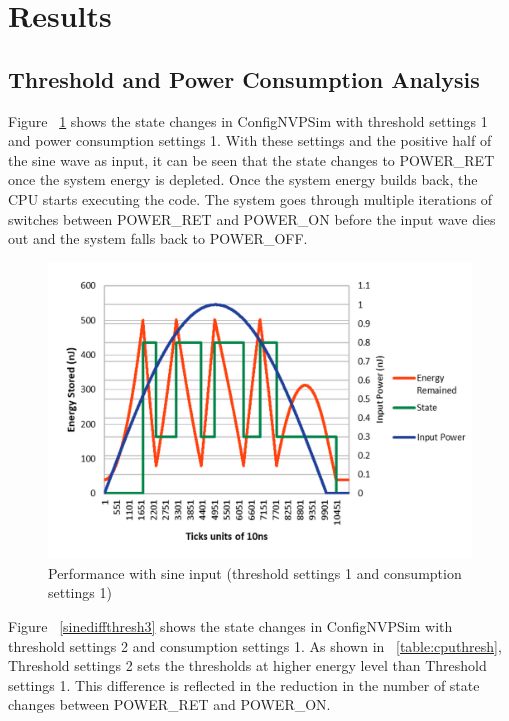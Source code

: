 \documentclass[conference]{IEEEtran}
\begin{document}
\section{\textbf{Results}}
\subsection{Threshold and Power Consumption Analysis}
Figure ~\ref{sine3} shows the state changes in ConfigNVPSim with threshold settings 1 and power consumption settings 1. With these settings and the positive half of the sine wave as input, it can be seen that the state changes to POWER\_RET once the system energy is depleted. Once the system energy builds back, the CPU starts executing the code. The system goes through multiple iterations of switches between POWER\_RET and POWER\_ON before the input wave dies out and the system falls back to POWER\_OFF. 

\begin{figure}[htbp]
\centerline{\includegraphics[scale=0.3]{sine3.png}}
\caption{Performance with sine input (threshold settings 1 and consumption settings 1)}
\label{sine3}
\end{figure}

Figure ~\ref{sinediffthresh3} shows the state changes in ConfigNVPSim with threshold settings 2 and consumption settings 1. As shown in ~\ref{table:cputhresh}, Threshold settings 2 sets the thresholds at higher energy level than Threshold settings 1. This difference is reflected in the reduction in the number of state changes between POWER\_RET and POWER\_ON.
\end{document}
